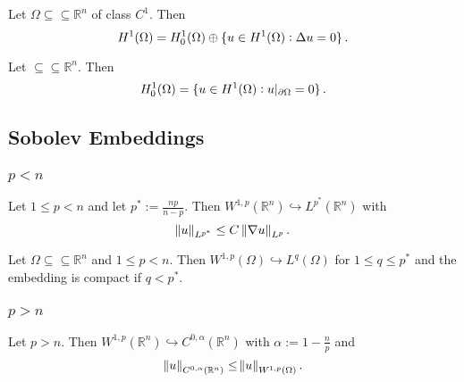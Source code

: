 \begin{theorem}
	Let $\Omega \subseteq \subseteq \mathbb{R}^n$ of class $C^1$. Then
	\begin{equation*}
		H^1(\Omega) = H^1_0(\Omega) \oplus \cbr[0]{u \in H^1(\Omega) : \Delta u = 0}.
	\end{equation*}
\end{theorem}

\begin{corollary}
	Let $\subseteq \subseteq \mathbb{R}^n$. Then
	\begin{equation*}
		H^1_0(\Omega) = \cbr[0]{u \in H^1(\Omega) : u\vert_{\partial \Omega} = 0}.
	\end{equation*}
\end{corollary}

\subsection*{Sobolev Embeddings}
\subsubsection*{$p < n$}

\begin{theorem}
	Let $1 \leq p < n$ and let $p^* := \frac{np}{n - p}$. Then $W^{1,p}(\mathbb{R}^n) \hookrightarrow L^{p^*}(\mathbb{R}^n)$ with
	\begin{equation*}
		\norm{u}_{L^{p^*}} \leq C \norm[0]{\nabla u}_{L^p}.
	\end{equation*}
\end{theorem}

\begin{theorem}
	Let $\Omega \subseteq \subseteq \mathbb{R}^n$ and $1 \leq p < n$. Then $W^{1,p}(\Omega) \hookrightarrow L^q(\Omega)$ for $1 \leq q \leq p^*$ and the embedding is compact if $q < p^*$.
\end{theorem}

\subsubsection*{$p > n$}

\begin{theorem}
	Let $p > n$. Then $W^{1,p}(\mathbb{R}^n) \hookrightarrow C^{0,\alpha}(\mathbb{R}^n)$ with $\alpha := 1 - \frac{n}{p}$ and
	\begin{equation*}
		\norm[0]{u}_{C^{0,\alpha}(\mathbb{R}^n)} \leq \norm{u}_{W^{1,p}(\Omega)}.
	\end{equation*}
\end{theorem}

